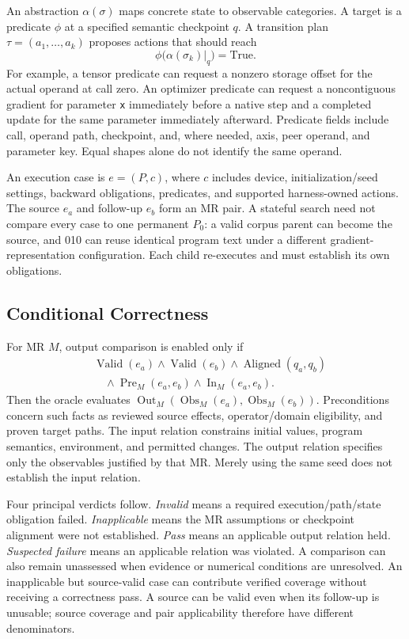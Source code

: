 \documentclass[conference]{IEEEtran}
\newcommand{\Pre}{\operatorname{Pre}}
\newcommand{\In}{\operatorname{In}}
\newcommand{\Out}{\operatorname{Out}}
\newcommand{\Obs}{\operatorname{Obs}}
\begin{document}
An abstraction $\alpha(\sigma)$ maps concrete state to observable categories. A target is a predicate $\phi$ at a specified semantic checkpoint $q$. A transition plan $\tau=(a_1,\ldots,a_k)$ proposes actions that should reach
\begin{equation}
 \phi\bigl(\alpha(\sigma_k)|_q\bigr)=\mathrm{True}.
\end{equation}
For example, a tensor predicate can request a nonzero storage offset for the actual operand at call zero. An optimizer predicate can request a noncontiguous gradient for parameter \texttt{x} immediately before a native step and a completed update for the same parameter immediately afterward. Predicate fields include call, operand path, checkpoint, and, where needed, axis, peer operand, and parameter key. Equal shapes alone do not identify the same operand.

An execution case is $e=(P,c)$, where $c$ includes device, initialization/seed settings, backward obligations, predicates, and supported harness-owned actions. The source $e_a$ and follow-up $e_b$ form an MR pair. A stateful search need not compare every case to one permanent $P_0$: a valid corpus parent can become the source, and 010 can reuse identical program text under a different gradient-representation configuration. Each child re-executes and must establish its own obligations.

\subsection{Conditional Correctness}
For MR $M$, output comparison is enabled only if
\begin{equation}
\begin{split}
 &\operatorname{Valid}(e_a)\land\operatorname{Valid}(e_b)\land
 \operatorname{Aligned}(q_a,q_b)\\
 &\hspace{1em}\land\Pre_M(e_a,e_b)\land\In_M(e_a,e_b).
\end{split}
\label{eq:guard}
\end{equation}
Then the oracle evaluates $\Out_M(\Obs_M(e_a),\Obs_M(e_b))$. Preconditions concern such facts as reviewed source effects, operator/domain eligibility, and proven target paths. The input relation constrains initial values, program semantics, environment, and permitted changes. The output relation specifies only the observables justified by that MR. Merely using the same seed does not establish the input relation.

Four principal verdicts follow. \emph{Invalid} means a required execution/path/state obligation failed. \emph{Inapplicable} means the MR assumptions or checkpoint alignment were not established. \emph{Pass} means an applicable output relation held. \emph{Suspected failure} means an applicable relation was violated. A comparison can also remain unassessed when evidence or numerical conditions are unresolved. An inapplicable but source-valid case can contribute verified coverage without receiving a correctness pass. A source can be valid even when its follow-up is unusable; source coverage and pair applicability therefore have different denominators.
\end{document}
